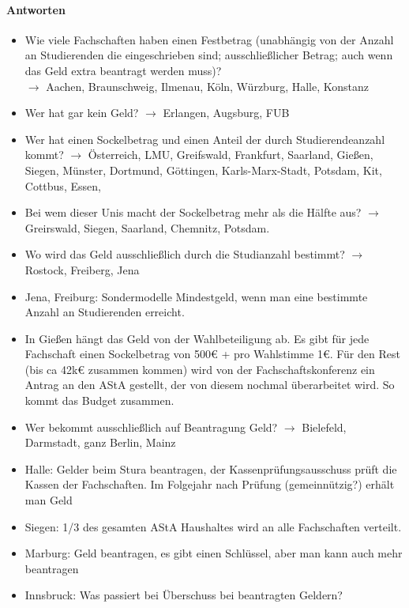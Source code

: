       \paragraph{Antworten}
        \begin{itemize}
          \item Wie viele Fachschaften haben einen Festbetrag (unabhängig von der Anzahl an Studierenden die eingeschrieben sind; ausschließlicher Betrag; auch wenn das Geld extra beantragt werden muss)? \\
          $\rightarrow$ Aachen, Braunschweig, Ilmenau, Köln, Würzburg, Halle, Konstanz
          \item Wer hat gar kein Geld? $\rightarrow$ Erlangen, Augsburg, FUB
          \item Wer hat einen Sockelbetrag und einen Anteil der durch Studierendeanzahl kommt? $\rightarrow$ Österreich, LMU, Greifswald, Frankfurt, Saarland, Gießen, Siegen, Münster, Dortmund, Göttingen, Karls-Marx-Stadt, Potsdam, Kit, Cottbus, Essen,
          \item Bei wem dieser Unis macht der Sockelbetrag mehr als die Hälfte aus? $\rightarrow$ Greirswald, Siegen, Saarland, Chemnitz, Potsdam.
          \item Wo wird das Geld ausschließlich durch die Studianzahl bestimmt? $\rightarrow$ Rostock, Freiberg, Jena
          \item Jena, Freiburg: Sondermodelle Mindestgeld, wenn man eine bestimmte Anzahl an Studierenden erreicht.
          \item In Gießen hängt das Geld von der Wahlbeteiligung ab. Es gibt für jede Fachschaft einen Sockelbetrag von 500€ + pro Wahlstimme 1€. Für den Rest (bis ca 42k€ zusammen kommen) wird von der Fachschaftskonferenz ein Antrag an den AStA gestellt, der von diesem nochmal überarbeitet wird. So kommt das Budget zusammen.
          \item Wer bekommt ausschließlich auf Beantragung Geld? $\rightarrow$ Bielefeld, Darmstadt, ganz Berlin, Mainz
          \item Halle: Gelder beim Stura beantragen, der Kassenprüfungsausschuss prüft die Kassen der Fachschaften. Im Folgejahr nach Prüfung (gemeinnützig?) erhält man Geld
          \item Siegen: 1/3 des gesamten AStA Haushaltes wird an alle Fachschaften verteilt.
          \item Marburg: Geld beantragen, es gibt einen Schlüssel, aber man kann auch mehr beantragen
          \item Innsbruck: Was passiert bei Überschuss bei beantragten Geldern? \\

\end{itemize}
